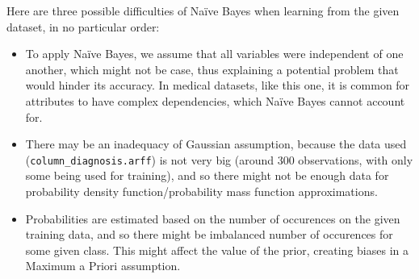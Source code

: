 \documentclass[12pt]{article}
\begin{document}
\begin{enumerate}[leftmargin=\labelsep]
          \vskip 0.3cm
          Here are three possible difficulties of Naïve Bayes when learning from the given dataset, in no particular order:

          \begin{itemize}
              \item To apply Naïve Bayes, we assume that all variables were independent of one another, which might not be case, thus explaining a
                    potential problem that would hinder its accuracy. In medical datasets, like this one, it is common for attributes to have complex
                    dependencies, which Naïve Bayes cannot account for.
              \item There may be an inadequacy of Gaussian assumption, because the data used (\texttt{column\_diagnosis.arff}) is not very big
                    (around 300 observations, with only some being used for training), and so there might not be enough data for probability density
                    function/probability mass function approximations.
              \item Probabilities are estimated based on the number of occurences on the given training data, and so there might be imbalanced
                    number of occurences for some given class. This might affect the value of the prior, creating biases in a Maximum a Priori
                    assumption.
          \end{itemize}
\end{enumerate}
\end{document}
